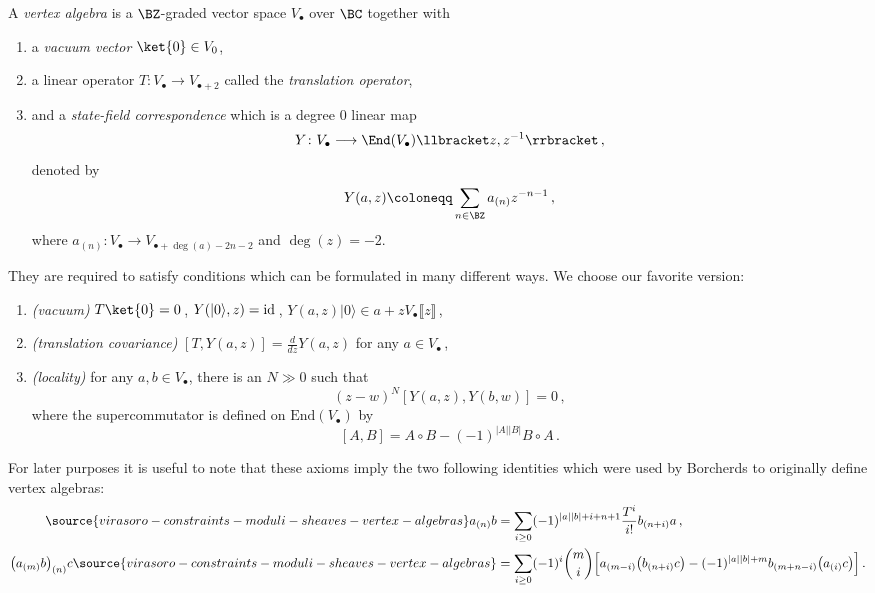  \begin{definition}
\notready
 \label{Def: axioms}
 A \textit{vertex algebra} is a $\BZ$-graded vector space $V_{\bullet}$ over $\BC$ together with
\begin{enumerate}
\item a \textit{vacuum vector} $\ket{0}\in V_0$,
    \item a linear operator
    $T\colon V_\bullet\to V_{\bullet+2}$
   called the \textit{translation operator},
    \item and a \textit{state-field correspondence} which is a degree 0 linear map
    $$
    Y\colon V_\bullet\longrightarrow \End(V_\bullet)\llbracket z,z^{-1} \rrbracket\,,
    $$
    denoted by
    $$Y(a,z)\coloneqq \sum_{n\in\BZ}{a_{(n)}}z^{-n-1}\,,
    $$
   where $a_{(n)}:V_\bullet\rightarrow V_{\bullet+\deg(a)-2n-2}$ and $\deg (z) =-2$.
\end{enumerate}

They are required to satisfy conditions which can be formulated in many different ways. We choose our favorite version:
\begin{enumerate}
    \item \textit{(vacuum)} $T\ket{0} = 0$\,, $Y(|0\rangle, z)=\textnormal{id}$\,, $Y(a,z)|0\rangle\in a+zV_\bullet\llbracket z\rrbracket$\,,
    \item \textit{(translation covariance)} $[T,Y(a,z)] = \frac{d}{dz} Y(a,z)$ for any $a\in V_\bullet$\,,
    \item \textit{(locality)} for any $a,b\in V_{\bullet}$, there is an $N\gg 0$ such that
    $$
    (z-w)^N[Y(a,z),Y(b,w)] = 0\,,
    $$
    where the supercommutator is defined on $\text{End}(V_\bullet)$ by
    $$
    [A,B] =A\circ B -  (-1)^{|A| |B|}B\circ A\,.
    $$
\end{enumerate}
\end{definition}
For later purposes it is useful to note that these axioms imply the two following identities which were used by Borcherds \cite[Section 4]{Borcherds} to originally define vertex algebras:
\begin{align}
\label{Eq: skewsymmetry}
\source{virasoro-constraints-moduli-sheaves-vertex-algebras}
a_{(n)}b &= \sum_{i\geq 0}(-1)^{|a||b|+i+n+1}\frac{T^i}{i!} b_{(n+i)}a\,,\\
\label{Eq: skewjacobi}\big(a_{(m)}b\big)_{(n)}c
\source{virasoro-constraints-moduli-sheaves-vertex-algebras}
&=\sum_{i\geq 0}(-1)^i \binom{m}{i}\Big[a_{(m-i)}\big(b_{(n+i)}c\big) -(-1)^{|a||b|+m}b_{(m+n-i)}\big(a_{(i)}c\big)\Big]\,.
\end{align}
